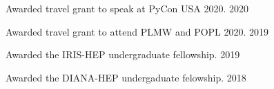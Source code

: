 \documentclass[10pt, letterpaper]{pagedeps}
\begin{document}
%
%

%
%
\begin{tightitemize}
    \item Awarded travel grant to speak at PyCon USA 2020. \hfill{2020}
    \item Awarded travel grant to attend PLMW and POPL 2020. \hfill{2019}
    \item Awarded the IRIS-HEP undergraduate fellowship. \hfill{2019}
	\item Awarded the DIANA-HEP undergaduate felowship. \hfill{2018}
\end{tightitemize}
\end{document}
